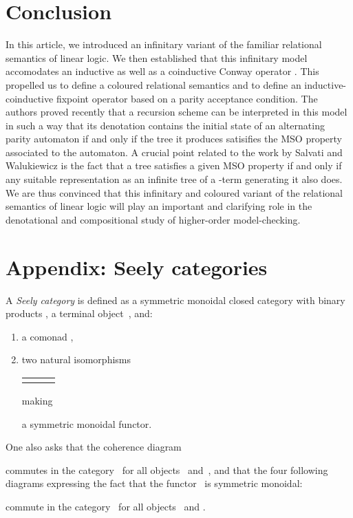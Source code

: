 \documentclass[runningheads,a4paper]{llncs}
\begin{document}
\section{Conclusion}\label{section/conclusion}

In this article, we introduced an infinitary variant of the familiar relational semantics of linear logic.
We then established that this infinitary model accomodates an inductive as well as a coinductive Conway operator .
This propelled us to define a coloured relational semantics and to define an inductive-coinductive fixpoint operator
based on a parity acceptance condition.
The authors proved recently \cite{coloured-tensorial-logic} that a recursion scheme can be interpreted in this model in such a way 
that its denotation contains the initial state of an alternating parity automaton if and only if the tree 
it produces satisifies the MSO property associated to the automaton. 
A crucial point related to the work by Salvati and Walukiewicz \cite{salvati-walukiewicz1}
is the fact that a tree satisfies a given MSO property if and only if any suitable representation 
as an infinite tree of a -term generating it also does.
We are thus convinced that this infinitary and coloured variant of the relational semantics of linear logic
will play an important and clarifying role in the denotational and compositional study of higher-order model-checking.






\section*{Appendix: Seely categories}
A \emph{Seely category} is defined as a symmetric monoidal closed category
 with binary products , a terminal object~, and:
\begin{enumerate}\item a comonad ,
\item two natural isomorphisms 
\begin{center}
\begin{tabular}{ccc}

&
\hspace{4em}
&

\end{tabular}
\end{center}
making

a symmetric monoidal functor.
\end{enumerate}
One also asks that the coherence diagram

commutes in the category~ for all objects~ and~, and that the four following diagrams expressing the fact that the functor~
is symmetric monoidal:



commute in the category~ for all objects~ and .
\end{document}
